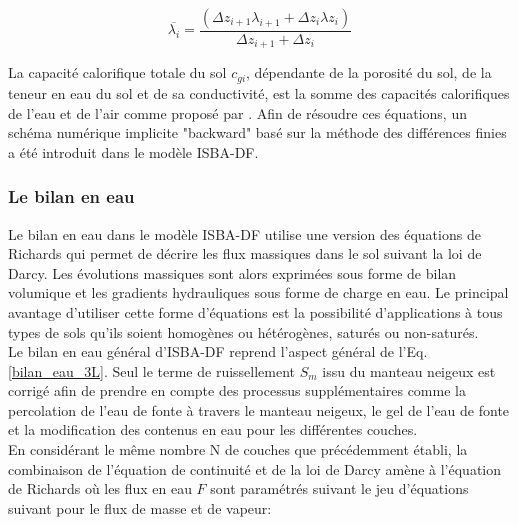 \begin{equation}
\overline{\lambda_{i}} = \frac{(\Delta z_{i+1}\lambda_{i+1}+\Delta z_{i}\lambda z_{i})}{\Delta z_{i+1}+\Delta z_{i}}
\end{equation}

\noindent La capacité calorifique totale du sol $c_{gi}$, dépendante de la porosité du sol, de la teneur en eau du sol et de sa conductivité, est la somme des capacités calorifiques de l'eau et de l'air comme proposé par \citet{peters1998}. Afin de résoudre ces équations, un schéma numérique implicite "backward" basé sur la méthode des différences finies a été introduit dans le modèle ISBA-DF.

\subsubsection{\selectfont Le bilan en eau}
Le bilan en eau dans le modèle ISBA-DF utilise une version des équations de Richards qui permet de décrire les flux massiques dans le sol suivant la loi de Darcy. Les évolutions massiques sont alors exprimées sous forme de bilan volumique et les gradients hydrauliques sous forme de charge en eau. Le principal avantage d'utiliser cette forme d'équations est la possibilité d'applications à tous types de sols qu'ils soient homogènes ou hétérogènes, saturés ou non-saturés.\\

\noindent Le bilan en eau général d'ISBA-DF reprend l'aspect général de l'Eq. \eqref{bilan_eau_3L}. Seul le terme de ruissellement $S_{m}$ issu du manteau neigeux est corrigé afin de prendre en compte des processus supplémentaires comme la percolation de l'eau de fonte à travers le manteau neigeux, le gel de l'eau de fonte et la modification des contenus en eau pour les différentes couches.\\

\noindent En considérant le même nombre N de couches que précédemment établi, la combinaison de l'équation de continuité et de la loi de Darcy amène à l'équation de Richards où les flux en eau $F$ sont paramétrés suivant le jeu d'équations suivant pour le flux de masse et de vapeur:

